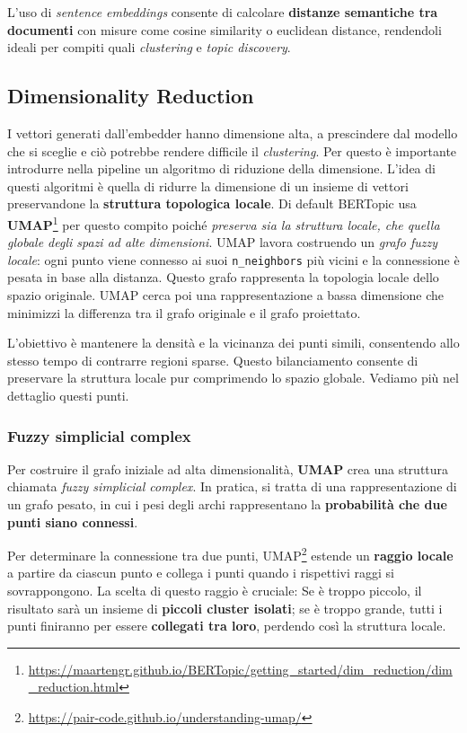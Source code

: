 \noindent L’uso di \textit{sentence embeddings} consente di calcolare \textbf{distanze semantiche tra documenti} con misure come cosine similarity o euclidean distance, rendendoli ideali per compiti quali \textit{clustering} e \textit{topic discovery}.
\subsection{Dimensionality Reduction}
I vettori generati dall'embedder hanno dimensione alta, a prescindere dal modello che si sceglie e ciò potrebbe rendere difficile il \emph{clustering}. Per questo è importante introdurre nella pipeline un algoritmo di riduzione della dimensione.
L'idea di questi algoritmi è quella di ridurre la dimensione di un insieme di vettori preservandone la \textbf{struttura topologica locale}.
Di default BERTopic usa \textbf{UMAP}\footnote{\url{https://maartengr.github.io/BERTopic/getting_started/dim_reduction/dim_reduction.html}} per questo compito poiché \emph{preserva sia la struttura locale, che quella globale degli spazi ad alte dimensioni}.
UMAP lavora costruendo un \textit{grafo fuzzy locale}: ogni punto viene connesso ai suoi \texttt{n\_neighbors} più vicini e la connessione è pesata in base alla distanza. Questo grafo rappresenta la topologia locale dello spazio originale.
UMAP cerca poi una rappresentazione a bassa dimensione che minimizzi la differenza tra il grafo originale e il grafo proiettato.

L'obiettivo è mantenere la densità e la vicinanza dei punti simili, consentendo allo stesso tempo di contrarre regioni sparse.
Questo bilanciamento consente di preservare la struttura locale pur comprimendo lo spazio globale.
Vediamo più nel dettaglio questi punti.
\subsubsection{Fuzzy simplicial complex}
Per costruire il grafo iniziale ad alta dimensionalità, \textbf{UMAP} crea una struttura chiamata \textit{fuzzy simplicial complex}. In pratica, si tratta di una rappresentazione di un grafo pesato, in cui i pesi degli archi rappresentano la \textbf{probabilità che due punti siano connessi}.

Per determinare la connessione tra due punti, UMAP\footnote{\url{https://pair-code.github.io/understanding-umap/}} estende un \textbf{raggio locale} a partire da ciascun punto e collega i punti quando i rispettivi raggi si sovrappongono. La scelta di questo raggio è cruciale:
Se è troppo piccolo, il risultato sarà un insieme di \textbf{piccoli cluster isolati};
se è troppo grande, tutti i punti finiranno per essere \textbf{collegati tra loro}, perdendo così la struttura locale.

